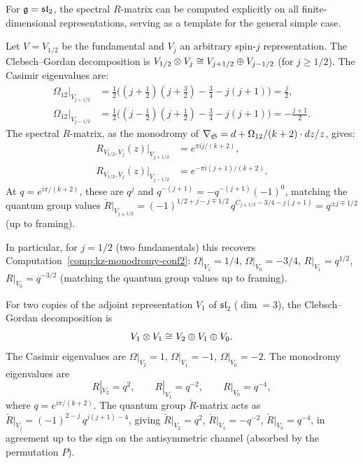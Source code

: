 For $\mathfrak{g} = \mathfrak{sl}_2$, the spectral $R$-matrix can be computed explicitly on all finite-dimensional representations, serving as a template for the general simple case.

\begin{computation}
\label{comp:spectral-R-fund-general}
Let $V = V_{1/2}$ be the fundamental and $V_j$ an arbitrary spin-$j$ representation. The Clebsch--Gordan decomposition is $V_{1/2} \otimes V_j \cong V_{j+1/2} \oplus V_{j-1/2}$ (for $j \geq 1/2$). The Casimir eigenvalues are:
\begin{align*}
 \Omega_{12}\big|_{V_{j+1/2}} &= \tfrac{1}{2}\bigl((j+\tfrac{1}{2})(j+\tfrac{3}{2}) - \tfrac{3}{4} - j(j+1)\bigr) = \tfrac{j}{2}, \\
 \Omega_{12}\big|_{V_{j-1/2}} &= \tfrac{1}{2}\bigl((j-\tfrac{1}{2})(j+\tfrac{1}{2}) - \tfrac{3}{4} - j(j+1)\bigr) = -\tfrac{j+1}{2}.
\end{align*}
The spectral $R$-matrix, as the monodromy of $\nabla_{\mathfrak{S}} = d + \Omega_{12}/(k+2) \cdot dz/z$, gives:
\begin{align*}
 R_{V_{1/2},V_j}(z)\big|_{V_{j+1/2}} &= e^{\pi i j/(k+2)}, \\
 R_{V_{1/2},V_j}(z)\big|_{V_{j-1/2}} &= e^{-\pi i (j+1)/(k+2)}.
\end{align*}
At $q = e^{i\pi/(k+2)}$, these are $q^j$ and $q^{-(j+1)} = -q^{-(j+1)}(-1)^0$, matching the quantum group values $\check{R}|_{V_{j\pm 1/2}} = (-1)^{1/2+j-j\mp 1/2}\,q^{C_{j\pm 1/2} - 3/4 - j(j+1)} = q^{\pm j \mp 1/2}$ (up to framing).

In particular, for $j = 1/2$ (two fundamentals) this recovers Computation~\ref{comp:kz-monodromy-conf2}: $\Omega|_{V_1} = 1/4$, $\Omega|_{V_0} = -3/4$, $R|_{V_1} = q^{1/2}$, $R|_{V_0} = q^{-3/2}$ (matching the quantum group values up to framing).
\end{computation}

\begin{computation}
\label{comp:R-matrix-adjoint}
For two copies of the adjoint representation $V_1$ of $\mathfrak{sl}_2$ ($\dim = 3$), the Clebsch--Gordan decomposition is
\[
 V_1 \otimes V_1 \cong V_2 \oplus V_1 \oplus V_0.
\]
The Casimir eigenvalues are $\Omega|_{V_2} = 1$, $\Omega|_{V_1} = -1$, $\Omega|_{V_0} = -2$.
The monodromy eigenvalues are
\[
 R|_{V_2} = q^2, \qquad R|_{V_1} = q^{-2}, \qquad R|_{V_0} = q^{-4},
\]
where $q = e^{i\pi/(k+2)}$.
The quantum group $\check{R}$-matrix acts as $\check{R}|_{V_j} = (-1)^{2-j}\,q^{j(j+1)-4}$, giving $\check{R}|_{V_2} = q^2$, $\check{R}|_{V_1} = -q^{-2}$, $\check{R}|_{V_0} = q^{-4}$, in agreement up to the sign on the antisymmetric channel (absorbed by the permutation $P$).
\end{computation}

